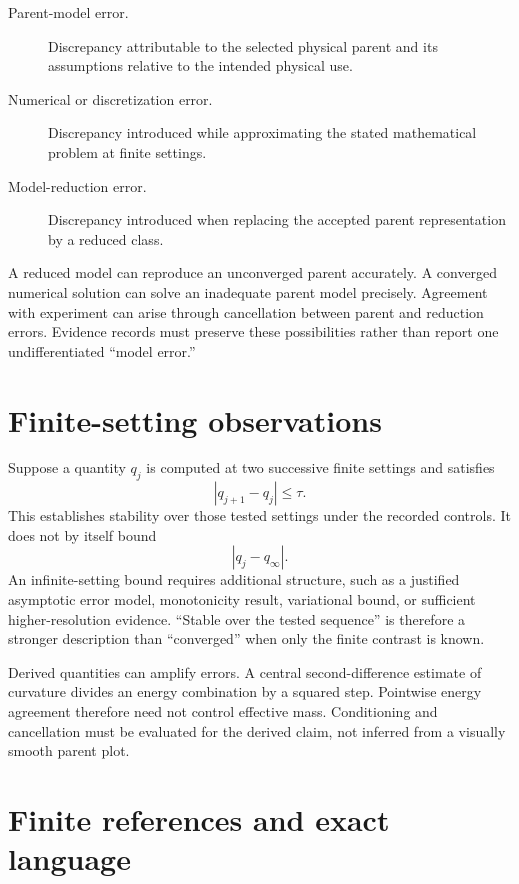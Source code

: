 \begin{description}
  \item[Parent-model error.] Discrepancy attributable to the selected physical
        parent and its assumptions relative to the intended physical use.
  \item[Numerical or discretization error.] Discrepancy introduced while
        approximating the stated mathematical problem at finite settings.
  \item[Model-reduction error.] Discrepancy introduced when replacing the
        accepted parent representation by a reduced class.
\end{description}

A reduced model can reproduce an unconverged parent accurately. A converged
numerical solution can solve an inadequate parent model precisely. Agreement
with experiment can arise through cancellation between parent and reduction
errors. Evidence records must preserve these possibilities rather than report
one undifferentiated ``model error.''

\section{Finite-setting observations}

Suppose a quantity \(q_j\) is computed at two successive finite settings and
satisfies
\begin{equation}
  |q_{j+1}-q_j|\leq\tau.
\end{equation}
This establishes stability over those tested settings under the recorded
controls. It does not by itself bound
\begin{equation}
  |q_j-q_{\infty}|.
\end{equation}
An infinite-setting bound requires additional structure, such as a justified
asymptotic error model, monotonicity result, variational bound, or sufficient
higher-resolution evidence. ``Stable over the tested sequence'' is therefore a
stronger description than ``converged'' when only the finite contrast is known.

Derived quantities can amplify errors. A central second-difference estimate of
curvature divides an energy combination by a squared step. Pointwise energy
agreement therefore need not control effective mass. Conditioning and
cancellation must be evaluated for the derived claim, not inferred from a
visually smooth parent plot.

\section{Finite references and exact language}

